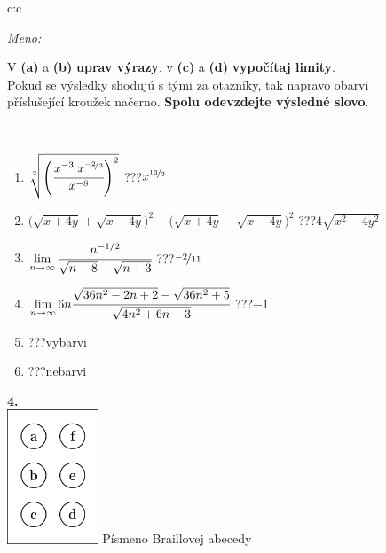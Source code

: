 \documentclass[10pt]{report}
\begin{document}
\begin{tabular}{c:c}
\begin{minipage}[c][104.5mm][t]{0.5\linewidth}
\begin{center}
\textit{Meno:}\phantom{xxxxxxxxxxxxxxxxxxxxxxxxxxxxxxxxxxxxxxxxxxxxxxxxxxxxxxxxxxxxxxxxx}\\[5mm]
\begin{minipage}{0.95\linewidth}
\begin{center}
V \textbf{(a)} a \textbf{(b)} \textbf{uprav výrazy}, v \textbf{(c)} a \textbf{(d)} \textbf{vypočítaj limity}.\\Pokud se výsledky shodujú s tými za otazníky, tak napravo obarvi\\příslušející kroužek načerno. \textbf{Spolu odevzdejte výsledné slovo}.
\end{center}
\end{minipage}
\\[1mm]
\begin{minipage}{0.79\linewidth}
\begin{center}
\begin{varwidth}{\linewidth}
\begin{enumerate}
\small
\item $\sqrt[2]{\left(\cfrac{x^{-3}\;x^{\nicefrac{-2}{3}}}{x^{-8}}\right)^{2}}$\quad \dotfill\; ???\;\dotfill \quad $x^{\nicefrac{13}{3}}$
\item {\footnotesize{\scriptsize$\big(\sqrt{x+4y}+\sqrt{x-4y}\big)^2-\big(\sqrt{x+4y}-\sqrt{x-4y}\big)^2$}\quad \dotfill\; ???\;\dotfill \quad $4\sqrt{x^2-4y^2}$}
\item $\lim\limits_{n\to\infty}\cfrac{n^{-1/2}}{\sqrt{n-8}-\sqrt{n+3}}$\quad \dotfill\; ???\;\dotfill \quad $\nicefrac{-2}{11}$
\item $\lim\limits_{n\to\infty}6n\cfrac{\sqrt{36n^2-2n+2}-\sqrt{36n^2+5}}{\sqrt{4n^2+6n-3}}$\quad \dotfill\; ???\;\dotfill \quad $-1$
\item \quad \dotfill\; ???\;\dotfill \quad vybarvi
\item \quad \dotfill\; ???\;\dotfill \quad nebarvi
\end{enumerate}
\end{varwidth}
\end{center}
\end{minipage}
\begin{minipage}{0.20\linewidth}
\begin{center}
{\Huge\bfseries 4.} \\[2mm]
\includegraphics[height=40mm]{../images/braille.png}
{\small Písmeno Braillovej abecedy}
\end{center}
\end{minipage}
\end{center}
\end{minipage}
%
\end{tabular}
\end{document}
